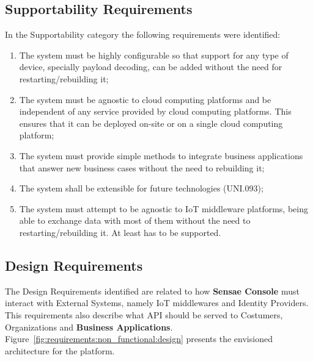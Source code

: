\subsection{Supportability Requirements}
\label{subsec:requirements:non_functional:supportability}

In the Supportability category the following requirements were identified:

\begin{enumerate}
    \item The system must be highly configurable so that support for any type of device, specially payload decoding, can be added without the need for restarting/rebuilding it;
    \item The system must be agnostic to cloud computing platforms and be independent of any service provided by cloud computing platforms. This ensures that it can be deployed on-site or on a single cloud computing platform;
    \item The system must provide simple methods to integrate business applications that answer new business cases without the need to rebuilding it;
    \item The system shall be extensible for future technologies (UNI.093);
    \item The system must attempt to be agnostic to \gls{IoT} middleware platforms, being able to exchange data with most of them without the need to restarting/rebuilding it. At least  has to be supported.
\end{enumerate}

\subsection{Design Requirements}
\label{subsec:requirements:non_functional:design}

The Design Requirements identified are related to how \textbf{Sensae Console} must interact with External Systems, namely \gls{IoT} middlewares and Identity Providers. This requirements also describe what \gls{API} should be served to Costumers, Organizations and \textbf{Business Applications}. Figure~\ref{fig:requirements:non_functional:design} presents the envisioned architecture for the platform.

